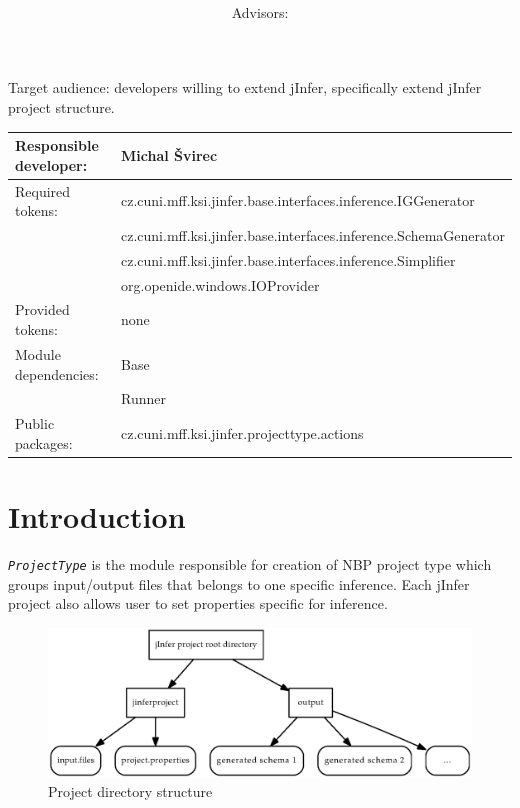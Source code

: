 \documentclass[a4paper,10pt,oneside]{article}
\title{\bf\mftitle}
\author{\mfauthor \\ Advisors: \mfadvisor}
\date{\mfplacedate}
\newcommand{\myscale}{0.74}
\newcommand{\jmodule}[1]{\texttt{\textit{#1}}}
\begin{document}
\maketitle
\noindent Target audience: developers willing to extend jInfer, specifically extend jInfer project structure.

\noindent \begin{tabular}{|l|l|} \hline
Responsible developer: & Michal Švirec \\ \hline
Required tokens:       & cz.cuni.mff.ksi.jinfer.base.interfaces.inference.IGGenerator \\
 & cz.cuni.mff.ksi.jinfer.base.interfaces.inference.SchemaGenerator \\
 & cz.cuni.mff.ksi.jinfer.base.interfaces.inference.Simplifier \\
 & org.openide.windows.IOProvider \\ \hline
Provided tokens:       & none \\ \hline
Module dependencies:   & Base \\
	& Runner \\ \hline
Public packages:       & cz.cuni.mff.ksi.jinfer.projecttype.actions \\ \hline
\end{tabular}

\section{Introduction}

\jmodule{ProjectType} is the module responsible for creation of NBP project type which groups input/output files that belongs to one specific inference. Each jInfer project also allows user to set properties specific for inference.\\

\begin{figure}
	\centering\includegraphics[scale=\myscale]{project_dir_structure}
	\caption{Project directory structure} \label{dir-structure}
\end{figure}
\end{document}
